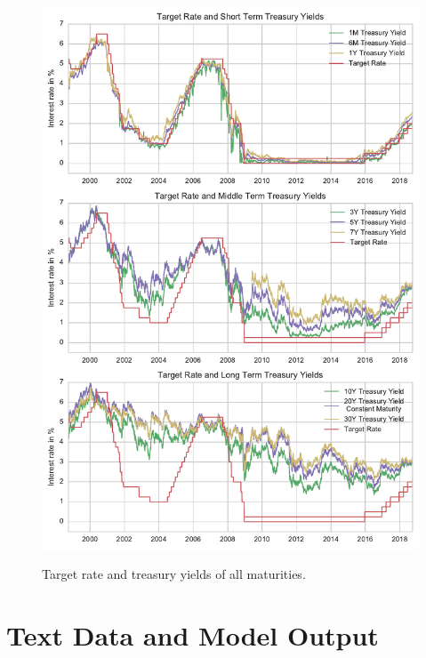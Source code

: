 \documentclass[11pt,a4paper,english,oneside]{book}
\numberwithin{equation}{chapter}
\begin{document}
\begin{figure}
	\caption{Target rate and treasury yields of all maturities.}
	\centering
	\includegraphics[scale=1]{Images/alltreasury.pdf}
	\label{alltreasury}
\end{figure}


\renewcommand{\theequation}{B.\arabic{equation}}


\chapter{Text Data and Model Output}\label{AppendixB}

\end{document}
